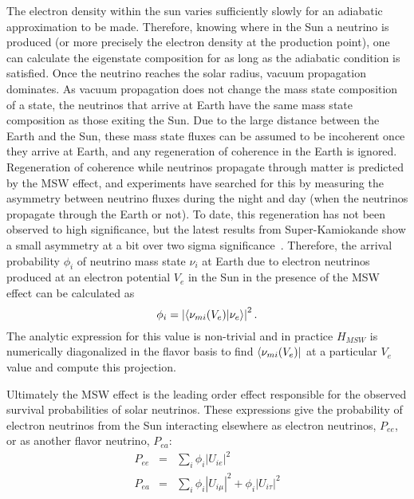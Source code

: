 The electron density within the sun varies sufficiently slowly for an adiabatic approximation to be made.
Therefore, knowing where in the Sun a neutrino is produced (or more precisely the electron density at the production point), one can calculate the eigenstate composition for as long as the adiabatic condition is satisfied.
Once the neutrino reaches the solar radius, vacuum propagation dominates. 
As vacuum propagation does not change the mass state composition of a state, the neutrinos that arrive at Earth have the same mass state composition as those exiting the Sun.
Due to the large distance between the Earth and the Sun, these mass state fluxes can be assumed to be incoherent once they arrive at Earth, and any regeneration of coherence in the Earth is ignored.
Regeneration of coherence while neutrinos propagate through matter is predicted by the MSW effect, and experiments have searched for this by measuring the asymmetry between neutrino fluxes during the night and day (when the neutrinos propagate through the Earth or not).
To date, this regeneration has not been observed to high significance, but the latest results from Super-Kamiokande show a small asymmetry at a bit over two sigma significance~\cite{superkiv}.
Therefore, the arrival probability $\phi_i$ of neutrino mass state $\nu_i$ at Earth due to electron neutrinos produced at an electron potential $V_e$ in the Sun in the presence of the MSW effect can be calculated as
\begin{equation}
\phi_i = \left| \braket{\nu_{m i}(V_e)}{\nu_e} \right|^2.
\label{rawflux}
\end{equation}
The analytic expression for this value is non-trivial and in practice $H_{MSW}$ is numerically diagonalized in the flavor basis to find $\bra{\nu_{m i}(V_e)}$ at a particular $V_e$ value and compute this projection.

Ultimately the MSW effect is the leading order effect responsible for the observed survival probabilities of solar neutrinos.
These expressions give the probability of electron neutrinos from the Sun interacting elsewhere as electron neutrinos, $P_{ee}$, or as another flavor neutrino, $P_{ea}$:
\begin{equation}
\begin{array}{rcl}
P_{ee} & = & \sum_i \phi_i |U_{ie}|^2  \\
P_{ea} & = & \sum_i \phi_i |U_{i\mu}|^2 + \phi_i |U_{i\tau}|^2
\end{array}
\label{msw_survive}
\end{equation}


